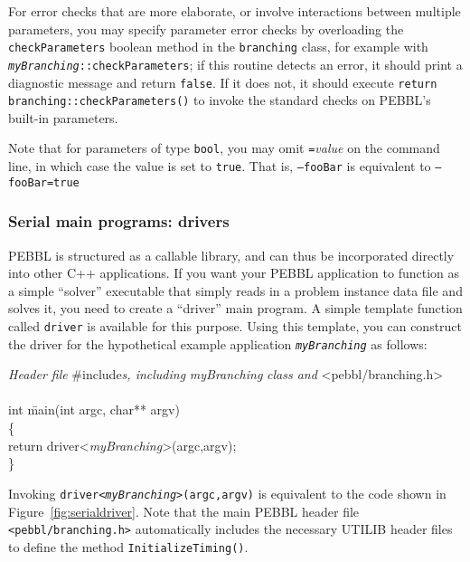 For error checks that are more elaborate, or involve interactions
between multiple parameters, you may specify parameter error checks by
overloading the \texttt{checkParameters} boolean method in the
\texttt{branching} class, for example with
\texttt{\textit{myBranching}::checkParameters}; if this routine
detects an error, it should print a diagnostic message and return
\texttt{false}.  If it does not, it should execute \texttt{return
  branching::checkParameters()} to invoke the standard checks on
PEBBL's built-in parameters.

Note that for parameters of type \texttt{bool}, you may omit
\texttt{=}\emph{value} on the command line, in which case the value is
set to \texttt{true}.  That is, \texttt{--fooBar} is
equivalent to \texttt{--fooBar=true}


\subsubsection{Serial main programs: drivers}
\label{sec:serialdriver}
PEBBL is structured as a callable library, and can thus be
incorporated directly into other C++ applications.  If you want your
PEBBL application to function as a simple ``solver'' executable that
simply reads in a problem instance data file and solves it, you need
to create a ``driver'' main program.  A simple template function called
\texttt{driver} is available for this purpose.  Using this
template, you can construct the driver for the hypothetical example
application \texttt{\emph{myBranching}} as follows:
\begin{codeblock}
\textrm{\emph{Header file}} \#include\textrm{\emph{s, including}} 
\emph{myBranching} \textrm{\emph{class and}} <pebbl/branching.h> \\
\\
int \=main(int argc, char** argv)\\
\{\\
  \> return driver<\emph{myBranching}>(argc,argv);\\
\}
\end{codeblock}
Invoking \texttt{driver<\emph{myBranching}>(argc,argv)} 
is equivalent to the code shown in Figure~\ref{fig:serialdriver}.
Note that the main PEBBL header file \texttt{<pebbl/branching.h>}
automatically includes the necessary UTILIB header files to define the
method \texttt{InitializeTiming()}.
